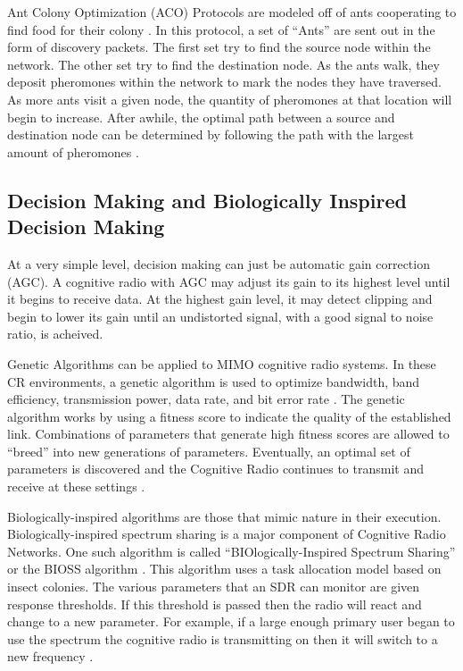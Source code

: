 Ant Colony Optimization (ACO) Protocols are modeled off of ants cooperating to find food for their colony \cite{7030885}. In this protocol, a set of ``Ants'' are sent out in the form of discovery packets. The first set try to find the source node within the network. The other set try to find the destination node. As the ants walk, they deposit pheromones within the network to mark the nodes they have traversed. As more ants visit a given node, the quantity of pheromones at that location will begin to increase. After awhile, the optimal path between a source and destination node can be determined by following the path with the largest amount of pheromones \cite{7030885}. 

\subsection{Decision Making and Biologically Inspired Decision Making}

At a very simple level, decision making can just be automatic gain correction (AGC). A cognitive radio with AGC may adjust its gain to its highest level until it begins to receive data. At the highest gain level, it may detect clipping and begin to lower its gain until an undistorted signal, with a good signal to noise ratio, is acheived. \cite{6497193}

Genetic Algorithms can be applied to MIMO cognitive radio systems. In these CR environments, a genetic algorithm is used to optimize bandwidth, band efficiency, transmission power, data rate, and bit error rate \cite{7124804}. The genetic algorithm works by using a fitness score to indicate the quality of the established link. Combinations of parameters that generate high fitness scores are allowed to ``breed'' into new generations of parameters. Eventually, an optimal set of parameters is discovered and the Cognitive Radio continues to transmit and receive at these settings \cite{7124804}.

Biologically-inspired algorithms are those that mimic nature in their execution. Biologically-inspired spectrum sharing is a major component of Cognitive Radio Networks. One such algorithm is called ``BIOlogically-Inspired Spectrum Sharing'' or the BIOSS algorithm \cite{4224259} \cite{5686503}. This algorithm uses a task allocation model based on insect colonies. The various parameters that an SDR can monitor are given response thresholds. If this threshold is passed then the radio will react and change to a new parameter. For example, if a large enough primary user began to use the spectrum the cognitive radio is transmitting on then it will switch to a new frequency \cite{4224259} \cite{5686503}. 

